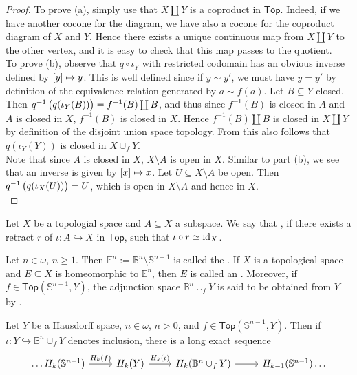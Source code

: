 \begin{proof}
	To prove (a), simply use that $X \coprod Y$ is a coproduct in $\mathsf{Top}$. Indeed, if we have another cocone for the diagram, we have also a cocone for the coproduct diagram of $X$ and $Y$. Hence there exists a unique continuous map from $X \coprod Y$ to the other vertex, and it is easy to check that this map passes to the quotient.\\
	To prove (b), observe that $q \circ \iota_Y$ with restricted codomain has an obvious inverse defined by $\sbr[0]{y} \mapsto y$. This is well defined since if $y {\sim}y'$, we must have $y = y'$ by definition of the equivalence relation generated by $a{\sim}f(a)$. Let $B \subseteq Y$ closed. Then $q^{-1}\del[1]{q(\iota_Y(B))} = f^{-1}(B) \coprod B$, and thus since $f^{-1}(B)$ is closed in $A$ and $A$ is closed in $X$, $f^{-1}(B)$ is closed in $X$. Hence $f^{-1}(B) \coprod B$ is closed in $X \coprod Y$ by definition of the disjoint union space topology. From this also follows that $q(\iota_Y(Y))$ is closed in $X \cup_f Y$.\\
	Note that since $A$ is closed in $X$, $X \setminus A$ is open in $X$. Similar to part (b), we see that an inverse is given by $\sbr{x} \mapsto x$. Let $U \subseteq X \setminus A$ be open. Then $q^{-1}\del[1]{q(\iota_X(U))} = U$, which is open in $X \setminus A$ and hence in $X$.\\
	
\end{proof}

\begin{definition}
	Let $X$ be a topologial space and $A \subseteq X$ a subspace. We say that , if there exists a retract $r$ of $\iota : A \hookrightarrow X$ in $\mathsf{Top}$, such that $\iota \circ r \simeq \operatorname{id}_X$.
\end{definition}

\begin{definition}[Cells]
	Let $n \in \omega$, $n \geq 1$. Then $\mathbb{E}^n := \mathbb{B}^n \setminus \mathbb{S}^{n-1}$ is called the . If $X$ is a topological space and $E \subseteq X$ is homeomorphic to $\mathbb{E}^n$, then $E$ is called an . Moreover, if $f \in \mathsf{Top}(\mathbb{S}^{n-1},Y)$, the adjunction space $\mathbb{B}^n \cup_f Y$ is said to be obtained from $Y$ by . 
\end{definition}

\begin{proposition}
	Let $Y$ be a Hausdorff space, $n \in \omega$, $n > 0$, and $f \in \mathsf{Top}(\mathbb{S}^{n - 1},Y)$. Then if $\iota : Y \hookrightarrow  \mathbb{B}^n \cup_f Y$ denotes inclusion, there is a long exact sequence
	\begin{equation*}
		\begin{tikzcd}
			\dots H_k(\mathbb{S}^{n - 1}) \arrow[r,"H_k(f)"] & H_k(Y) \arrow[r,"H_k(\iota)"] & H_k(\mathbb{B}^n \cup_f Y) \arrow[r] & H_{k - 1}(\mathbb{S}^{n - 1}) \dots
		\end{tikzcd}
	\end{equation*}
\end{proposition}
